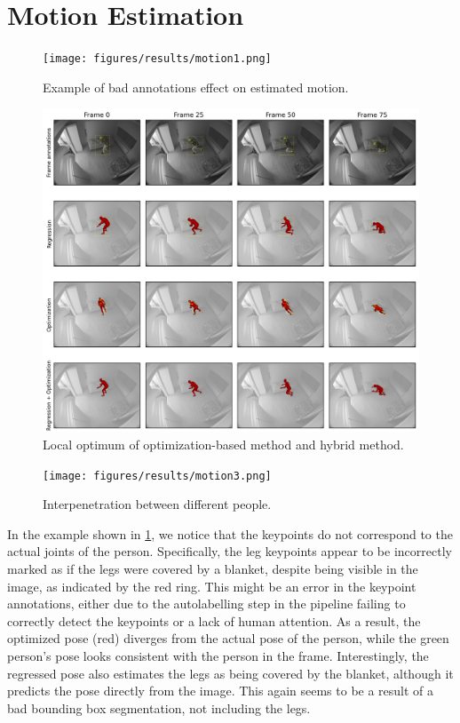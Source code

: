 \section*{Motion Estimation}
\begin{figure}[H]
    \centering
    \texttt{[image: figures/results/motion1.png]}
    \caption{Example of bad annotations effect on estimated motion.}
    \label{fig:motion1}
\end{figure}

\begin{figure}[H]
    \centering
    \includegraphics[width=0.9\linewidth]{figures/results/motion2.png}
    \caption{Local optimum of optimization-based method and hybrid method.}
    \label{fig:motion2}
\end{figure}

\begin{figure}[H]
    \centering
    \texttt{[image: figures/results/motion3.png]}
    \caption{Interpenetration between different people.}
    \label{fig:motion3}
\end{figure}

In the example shown in \cref{fig:motion1}, we notice that the keypoints do not correspond to the actual joints of the person. Specifically, the leg keypoints appear to be incorrectly marked as if the legs were covered by a blanket, despite being visible in the image, as indicated by the red ring. This might be an error in the keypoint annotations, either due to the autolabelling step in the pipeline failing to correctly detect the keypoints or a lack of human attention. As a result, the optimized pose (red) diverges from the actual pose of the person, while the green person's pose looks consistent with the person in the frame. Interestingly, the regressed pose also estimates the legs as being covered by the blanket, although it predicts the pose directly from the image. This again seems to be a result of a bad bounding box segmentation, not including the legs.


